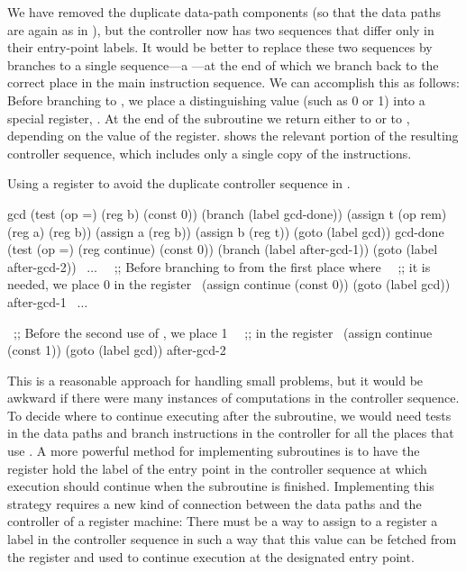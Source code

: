 \noindent
We have removed the duplicate data-path components (so that the data paths are
again as in ), but the controller now has two 
sequences that differ only in their entry-point labels.  It would be better to
replace these two sequences by branches to a single sequence---a 
---at the end of which we branch back to the correct place
in the main instruction sequence.  We can accomplish this as follows: Before
branching to , we place a distinguishing value (such as 0 or 1) into
a special register, .  At the end of the  subroutine
we return either to  or to , depending on
the value of the  register.  shows the relevant
portion of the resulting controller sequence, which includes only a single copy
of the  instructions.

\begin{codeFigure}
  {%
    Using a  register to avoid the duplicate controller sequence
    in .
  }%
\begin{codeBlock}
gcd
 (test (op =) (reg b) (const 0))
 (branch (label gcd-done))
 (assign t (op rem) (reg a) (reg b))
 (assign a (reg b))
 (assign b (reg t))
 (goto (label gcd))
gcd-done
 (test (op =) (reg continue) (const 0))
 (branch (label after-gcd-1))
 (goto (label after-gcd-2))
  ~\( \dots \)~
 ~\textrm{;; Before branching to  from the first place where}~
 ~\textrm{;; it is needed, we place 0 in the  register}~
 (assign continue (const 0))
 (goto (label gcd))
after-gcd-1
  ~\( \dots \)~

 ~\textrm{;; Before the second use of , we place 1}~
 ~\textrm{;; in the  register}~
 (assign continue (const 1))
 (goto (label gcd))
after-gcd-2
\end{codeBlock}
\end{codeFigure}

\noindent
This is a reasonable approach for handling small problems, but it would be
awkward if there were many instances of  computations in the
controller sequence.  To decide where to continue executing after the
 subroutine, we would need tests in the data paths and branch
instructions in the controller for all the places that use .  A more
powerful method for implementing subroutines is to have the 
register hold the label of the entry point in the controller sequence at which
execution should continue when the subroutine is finished.  Implementing this
strategy requires a new kind of connection between the data paths and the
controller of a register machine: There must be a way to assign to a register a
label in the controller sequence in such a way that this value can be fetched
from the register and used to continue execution at the designated entry point.

